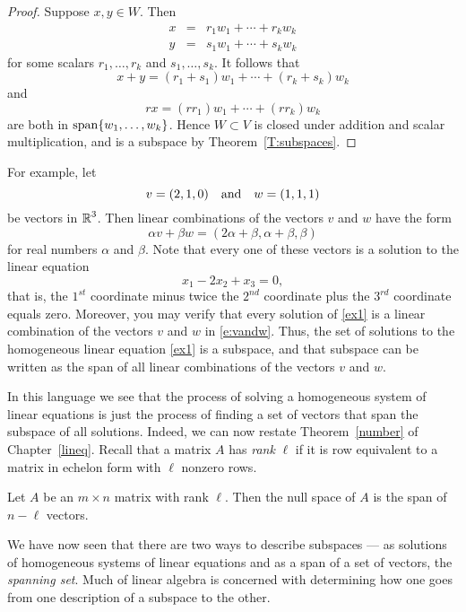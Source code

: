 \documentclass{ximera}
\begin{document}
\begin{proof}  Suppose $x,y\in W$.  Then
\begin{eqnarray*}
x & = & r_1w_1 + \cdots + r_kw_k \\
y & = & s_1w_1 + \cdots + s_kw_k
\end{eqnarray*}
for some scalars $r_1,\ldots,r_k$ and $s_1,\ldots,s_k$.  It
follows that
\[
x+y = (r_1+s_1)w_1 + \cdots + (r_k+s_k)w_k
\]
and
\[
rx = (rr_1)w_1 + \cdots + (rr_k)w_k
\]
are both in ${\rm span}\{w_1,\ldots,w_k\}$. Hence $W\subset V$ is
closed under addition and scalar multiplication, and is a
subspace by Theorem~\ref{T:subspaces}. \end{proof}

For example, let
\begin{equation}  \label{e:vandw}
v=(2,1,0) \quad\mbox{and}\quad w=(1,1,1)
\end{equation}
be vectors in $\mbox{$\Bbb{R}$}^3$. Then linear combinations of the vectors
$v$ and $w$ have the form
\[
\alpha v + \beta w = (2\alpha+\beta, \alpha+\beta, \beta)
\]
for real numbers $\alpha$ and $\beta$.  Note that every one of
these vectors is a solution to the linear equation
\begin{equation} \label{ex1}
x_1 - 2x_2 + x_3 = 0,
\end{equation}
that is, the $1^{st}$ coordinate minus twice the $2^{nd}$ coordinate 
plus the $3^{rd}$ coordinate equals zero.  Moreover, you may verify 
that every solution of \eqref{ex1} is a linear combination
of the vectors $v$ and $w$ in \eqref{e:vandw}.  Thus, the set of
solutions to the homogeneous linear equation
\eqref{ex1} is a
subspace, and that subspace can be written as the span of
all linear combinations of the vectors $v$ and $w$.

In this language we see that the process of solving a
homogeneous system of linear equations is just the process of
finding a set of vectors that span the subspace of all
solutions.  Indeed,
we can now restate Theorem~\ref{number} of Chapter~\ref{lineq}.
Recall that a matrix $A$ has {\em rank\/} $\ell$ if it is row
equivalent to a matrix in echelon form with $\ell$ nonzero rows.

\begin{proposition}  \label{P:n-rank}
Let $A$ be an $m\times n$ matrix with rank $\ell$. Then the
null space of $A$ is the span of $n-\ell$ vectors.
\end{proposition}  

We have now seen that there are two ways to describe subspaces ---
as solutions of homogeneous systems of linear equations and as a
span of a set of vectors, the {\em spanning set}.
Much of linear algebra is concerned
with determining how one goes from one description of a subspace
to the other.
\end{document}
